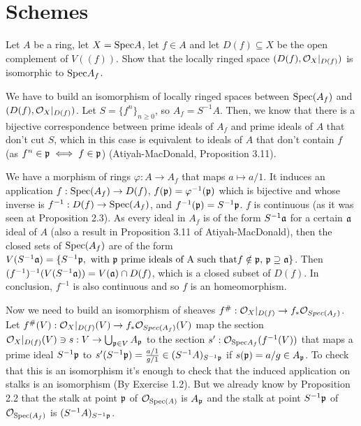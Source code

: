 \section{Schemes}

\begin{ex}
	Let $A$ be a ring, let $X = \mathrm{Spec} A$, let $f \in A$ and let $D(f) \subseteq X$ be the open complement of $V((f))$. Show that the locally ringed space $(D(f), \mathcal{O}_X|_{D(f)})$ is isomorphic to $\mathrm{Spec} A_f$.
\end{ex}

\begin{sol}
	We have to build an isomorphism of locally ringed spaces between $\mathrm{Spec}(A_f)$ and $(D(f), \mathcal{O}_X|_{D(f)})$. Let $S = \{f^n\}_{n \geq 0}$, so $A_f = S^{-1}A$. Then, we know that there is a bijective correspondence between prime ideals of $A_f$ and prime ideals of $A$ that don't cut $S$, which in this case is equivalent to ideals of $A$ that don't contain $f$ (as $f^n \in \mathfrak{p} \iff f \in \mathfrak{p}$) (Atiyah-MacDonald, Proposition 3.11).

	We have a morphism of rings $\varphi: A \to A_{f}$ that maps $a \mapsto a/1$. It induces an application $f: \mathrm{Spec} (A_f) \to D(f)$, $f(\mathfrak{p}) =  \varphi^{-1}(\mathfrak{p})$ which is bijective and whose inverse is $f^{-1}: D(f) \to \mathrm{Spec}(A_f)$, and $f^{-1}(\mathfrak{p}) = S^{-1}\mathfrak{p}$. $f$ is continuous (as it was seen at Proposition 2.3). As every ideal in $A_f$ is of the form $S^{-1}\mathfrak{a}$ for a certain $\mathfrak{a}$ ideal of $A$ (also a result in Proposition 3.11 of Atiyah-MacDonald), then the closed sets of $\mathrm{Spec}(A_f)$ are of the form $V(S^{-1}\mathfrak{a}) = \{S^{-1}\mathfrak{p}, \text{ with } \mathfrak{p} \text{ prime ideals of A such that} f \notin \mathfrak{p}, \, \mathfrak{p} \supseteq \mathfrak{a}\}$. Then $(f^{-1})^{-1}(V(S^{-1}\mathfrak{a})) = V(\mathfrak{a}) \cap D(f)$, which is a closed subset of $D(f)$. In conclusion, $f^{-1}$ is also continuous and so $f$ is an homeomorphism.

	Now we need to build an isomorphism of sheaves $f^{\#}: \mathcal{O}_X|_{D(f)} \to f_* \mathcal{O}_{Spec(A_f)}$. Let $f^{\#}(V): \mathcal{O}_X|_{D(f)}(V) \to f_* \mathcal{O}_{Spec(A_f)}(V)$ map the section $\mathcal{O}_X|_{D(f)}(V) \ni s : V \to \bigcup_{\mathfrak{p} \in V} A_{\mathfrak{p}}$ to the section $s': \mathcal{O}_{\mathrm{Spec}{A_f}}(f^{-1}(V))$ that maps a prime ideal $S^{-1}\mathfrak{p}$ to $s'(S^{-1}\mathfrak{p}) = \frac{a/1}{g/1} \in (S^{-1}A)_{S^{-1}\mathfrak{p}}$ if $s(\mathfrak{p}) = a/g \in A_{\mathfrak{p}}$. To check that this is an isomorphism it's enough to check that the induced application on stalks is an isomorphism (By Exercise 1.2). But we already know by Proposition 2.2 that the stalk at point $\mathfrak{p}$ of $\mathcal{O}_{\mathrm{Spec}(A)}$ is $A_{\mathfrak{p}}$ and the stalk at point $S^{-1}\mathfrak{p}$ of $\mathcal{O}_{\mathrm{Spec}(A_f)}$ is $(S^{-1}A)_{S^{-1}\mathfrak{p}}$. 


\end{sol}
